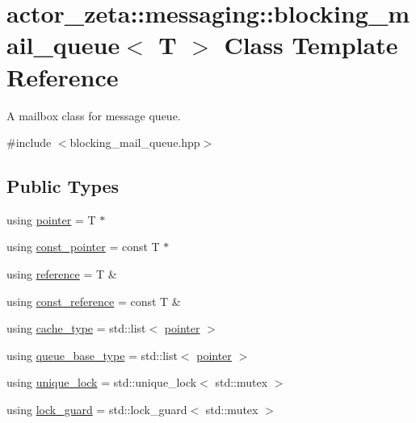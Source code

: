 \hypertarget{classactor__zeta_1_1messaging_1_1blocking__mail__queue}{}\section{actor\+\_\+zeta\+:\+:messaging\+:\+:blocking\+\_\+mail\+\_\+queue$<$ T $>$ Class Template Reference}
\label{classactor__zeta_1_1messaging_1_1blocking__mail__queue}


A mailbox class for message queue.  




{\ttfamily \#include $<$blocking\+\_\+mail\+\_\+queue.\+hpp$>$}

\subsection*{Public Types}
\begin{DoxyCompactItemize}
\item 
using \hyperlink{classactor__zeta_1_1messaging_1_1blocking__mail__queue_a64432628c6a91d330431fc3299021045}{pointer} = T $\ast$
\item 
using \hyperlink{classactor__zeta_1_1messaging_1_1blocking__mail__queue_a2615c2611ffdb978624dd2eccc75fe57}{const\+\_\+pointer} = const T $\ast$
\item 
using \hyperlink{classactor__zeta_1_1messaging_1_1blocking__mail__queue_a838522d611616b1bd7c46da5fe6895fb}{reference} = T \&
\item 
using \hyperlink{classactor__zeta_1_1messaging_1_1blocking__mail__queue_a6a883fe6a6e606317f85156f957f84fd}{const\+\_\+reference} = const T \&
\item 
using \hyperlink{classactor__zeta_1_1messaging_1_1blocking__mail__queue_a20156eef06b0a688ceeb663097a90862}{cache\+\_\+type} = std\+::list$<$ \hyperlink{classactor__zeta_1_1messaging_1_1blocking__mail__queue_a64432628c6a91d330431fc3299021045}{pointer} $>$
\item 
using \hyperlink{classactor__zeta_1_1messaging_1_1blocking__mail__queue_a3d270721dd7c3e166e39578cc6b761ce}{queue\+\_\+base\+\_\+type} = std\+::list$<$ \hyperlink{classactor__zeta_1_1messaging_1_1blocking__mail__queue_a64432628c6a91d330431fc3299021045}{pointer} $>$
\item 
using \hyperlink{classactor__zeta_1_1messaging_1_1blocking__mail__queue_a61d0417725665aba520dc0a51f1ec37a}{unique\+\_\+lock} = std\+::unique\+\_\+lock$<$ std\+::mutex $>$
\item 
using \hyperlink{classactor__zeta_1_1messaging_1_1blocking__mail__queue_aa98535adfab3ed0daf9f615f6f8edaaa}{lock\+\_\+guard} = std\+::lock\+\_\+guard$<$ std\+::mutex $>$
\end{DoxyCompactItemize}
